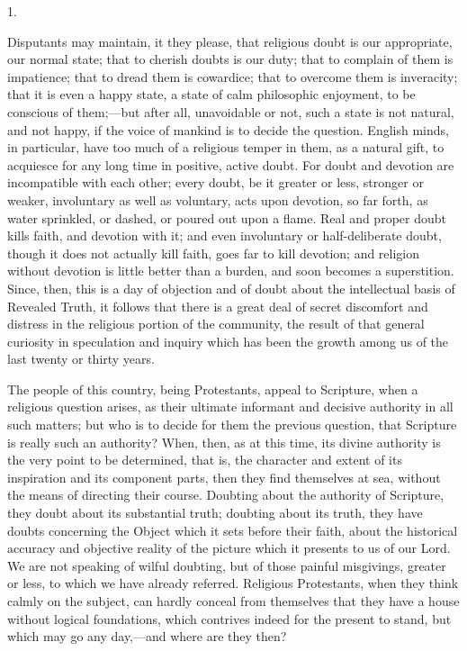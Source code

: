 1.

Disputants may maintain, it they please, that
religious doubt is our appropriate, our normal state; that to cherish
doubts is our duty; that to complain of them is impatience; that to
dread them is cowardice; that to overcome them is inveracity; that it
is even a happy state, a state of calm philosophic enjoyment, to be
conscious of them;—but after all, unavoidable or not, such a state
is not natural, and not happy, if the voice of mankind is to decide
the question. English minds, in particular, have too much of a
religious temper in them, as a natural gift, to acquiesce for any long
time in positive, active doubt. For doubt and devotion are
incompatible with each other; every doubt, be it greater or less,
stronger or weaker, involuntary as well as voluntary, acts upon
devotion, so far forth, as water sprinkled, or dashed, or poured out
upon a flame. Real and proper doubt kills faith, and devotion with it;
and even involuntary or half-deliberate doubt, though it does not
actually kill faith, goes far to kill devotion; and religion without
devotion is little better than a burden, and soon becomes a
superstition. Since, then, this is a day of objection and of doubt
about the intellectual basis of Revealed Truth, it follows that there
is a great deal of secret discomfort and distress in the religious
portion of the community, the result of that general curiosity in
speculation and inquiry which has been the growth among us of the last
twenty or thirty years.

The people of this country, being Protestants,
appeal to Scripture, when a religious question arises, as their
ultimate informant and decisive authority in all such matters; but who
is to decide for them the previous question, that Scripture is really
such an authority? When, then, as at this time, its divine authority
is the very point to be determined, that is, the character and extent
of its inspiration and its component parts, then they find themselves
at sea, without the means of directing their course. Doubting about
the authority of Scripture, they doubt about its substantial truth;
doubting about its truth, they have doubts concerning the Object which
it sets before their faith, about the historical accuracy and
objective reality of the picture which it presents to us of our Lord.
We are not speaking of wilful doubting, but of those painful
misgivings, greater or less, to which we have already referred.
Religious Protestants, when they think calmly on the subject, can
hardly conceal from themselves that they have a house without logical
foundations, which contrives indeed for the present to stand,
but which may go any day,—and where are they then?

